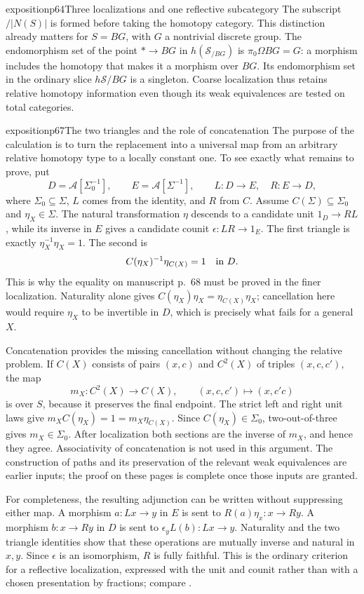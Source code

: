 \begin{dcomment}{exposition}{p64}{Three localizations and one reflective subcategory}
The subscript $/|N(S)|$ is formed before taking the homotopy category. This distinction already matters for $S=BG$, with $G$ a nontrivial discrete group. The endomorphism set of the point $*\to BG$ in $h(\mathcal S_{/BG})$ is $\pi_0\Omega BG=G$: a morphism includes the homotopy that makes it a morphism over $BG$. Its endomorphism set in the ordinary slice $h\mathcal S/BG$ is a singleton. Coarse localization thus retains relative homotopy information even though its weak equivalences are tested on total categories.
\end{dcomment}

\begin{dcomment}{exposition}{p67}{The two triangles and the role of concatenation}
The purpose of the calculation is to turn the replacement into a universal map from an arbitrary relative homotopy type to a locally constant one. To see exactly what remains to prove, put
\[
 D=\mathcal A[\Sigma_0^{-1}],\qquad E=\mathcal A[\Sigma^{-1}],\qquad
 L:D\longrightarrow E,\quad R:E\longrightarrow D,
\]
where $\Sigma_0\subseteq\Sigma$, $L$ comes from the identity, and $R$ from $C$. Assume $C(\Sigma)\subseteq\Sigma_0$ and $\eta_X\in\Sigma$. The natural transformation $\eta$ descends to a candidate unit $1_D\to RL$, while its inverse in $E$ gives a candidate counit $\epsilon:LR\to1_E$. The first triangle is exactly $\eta_X^{-1}\eta_X=1$. The second is
\[
 C(\eta_X)^{-1}\eta_{C(X)}=1
 \quad\hbox{in }D.
\]
This is why the equality on manuscript p.~68 must be proved in the finer localization. Naturality alone gives
$C(\eta_X)\eta_X=\eta_{C(X)}\eta_X$; cancellation here would require $\eta_X$ to be invertible in $D$, which is precisely what fails for a general $X$.

Concatenation provides the missing cancellation without changing the relative problem. If $C(X)$ consists of pairs $(x,c)$ and $C^2(X)$ of triples $(x,c,c')$, the map
\[
 m_X:C^2(X)\longrightarrow C(X),\qquad(x,c,c')\longmapsto(x,c'c)
\]
is over $S$, because it preserves the final endpoint. The strict left and right unit laws give
$m_XC(\eta_X)=1=m_X\eta_{C(X)}$. Since $C(\eta_X)\in\Sigma_0$, two-out-of-three gives $m_X\in\Sigma_0$. After localization both sections are the inverse of $m_X$, and hence they agree. Associativity of concatenation is not used in this argument. The construction of paths and its preservation of the relevant weak equivalences are earlier inputs; the proof on these pages is complete once those inputs are granted.

For completeness, the resulting adjunction can be written without suppressing either map. A morphism $a:Lx\to y$ in $E$ is sent to $R(a)\eta_x:x\to Ry$. A morphism $b:x\to Ry$ in $D$ is sent to $\epsilon_yL(b):Lx\to y$. Naturality and the two triangle identities show that these operations are mutually inverse and natural in $x,y$. Since $\epsilon$ is an isomorphism, $R$ is fully faithful. This is the ordinary criterion for a reflective localization, expressed with the unit and counit rather than with a chosen presentation by fractions; compare \citet[\S4.3]{Riehl2016}.


\end{dcomment}
